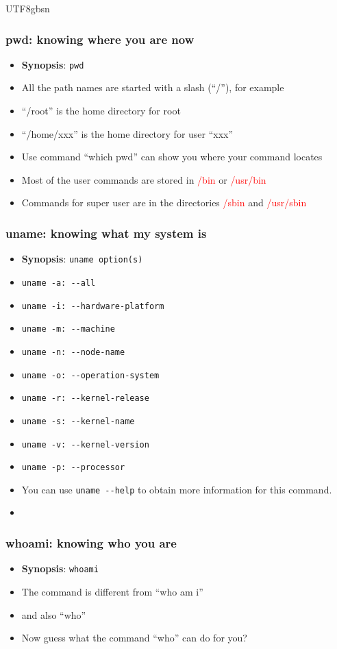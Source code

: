\documentclass[red]{beamer}
\begin{document}
\begin{CJK*}{UTF8}{gbsn}
\begin{frame}
\frametitle{pwd: knowing where you are now}
\begin{itemize}
    \item \textbf{Synopsis}: \lstinline{pwd}
    \item All the path names are started with a slash (``/''), for example
    \item ``/root'' is the home directory for root
    \item ``/home/xxx'' is the home directory for user ``xxx''
    \item Use command ``which pwd'' can show you where your command locates
    \item Most of the user commands are stored in \textcolor{red}{/bin} or \textcolor{red}{/usr/bin}
    \item Commands for super user are in the directories \textcolor{red}{/sbin} and \textcolor{red}{/usr/sbin}
\end{itemize}
\end{frame}

\begin{frame}
\frametitle{uname: knowing what my system is}
\begin{itemize}
    \item \textbf{Synopsis}: \lstinline{uname option(s)}
    \item \lstinline{uname -a: --all}
    \item \lstinline{uname -i: --hardware-platform}
    \item \lstinline{uname -m: --machine}
    \item \lstinline{uname -n: --node-name}
    \item \lstinline{uname -o: --operation-system}
    \item \lstinline{uname -r: --kernel-release}
    \item \lstinline{uname -s: --kernel-name}
    \item \lstinline{uname -v: --kernel-version}
    \item \lstinline{uname -p: --processor}
    \item You can use \lstinline{uname --help} to obtain more information for this command.
    \item \color{blue!80}{This command is very useful in compiling the system-dependent code.}
\end{itemize}
\end{frame}

\begin{frame}
\frametitle{whoami: knowing who you are}
\begin{itemize}
    \item \textbf{Synopsis}: \lstinline{whoami}
    \item The command is different from ``who am i''
    \item and also ``who''
    \item Now guess what the command ``who'' can do for you?
\end{itemize}
\end{frame}


\end{CJK*}
\end{document}
